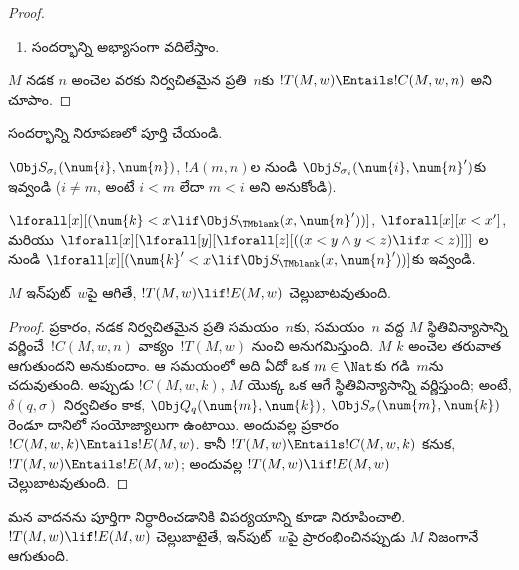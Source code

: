 \documentclass[../../../include/open-logic-section]{subfiles}
\begin{document}
\begin{proof}
\begin{enumerate}
\item {} సందర్భాన్ని అభ్యాసంగా వదిలేస్తాం.
\end{enumerate}
$M$ నడక $n$ అంచెల వరకు నిర్వచితమైన ప్రతి~$n$కు
$!T(M,w) \Entails !C(M,w,n)$ అని చూపాం.
\end{proof}

\begin{prob}
 సందర్భాన్ని
 నిరూపణలో పూర్తి చేయండి.
\end{prob}

\begin{prob}
$\Obj S_{\sigma_i}(\num{i},\num{n})$, $!A(m,n)$ల నుండి
$\Obj S_{\sigma_i}(\num{i},\num{n}')$కు  ఇవ్వండి
($i\neq m$, అంటే $i<m$ లేదా $m<i$ అని అనుకోండి).
\end{prob}

\begin{prob}
$\lforall[x][(\num{k}<x \lif \Obj S_\TMblank(x,\num{n}'))]$,
$\lforall[x][x<x']$, మరియు
$\lforall[x][\lforall[y][\lforall[z][((x<y \land y<z) \lif x<z)]]]$
ల నుండి
$\lforall[x][(\num{k}'<x \lif \Obj S_\TMblank(x,\num{n}'))]$కు
 ఇవ్వండి.
\end{prob}

\begin{lem}
$M$ ఇన్‌పుట్~$w$పై ఆగితే, $!T(M,w) \lif !E(M,w)$ చెల్లుబాటవుతుంది.
\end{lem}

\begin{proof}
 ప్రకారం, నడక నిర్వచితమైన ప్రతి సమయం~$n$కు, సమయం~$n$ వద్ద
$M$ స్థితివిన్యాసాన్ని వర్ణించే~$!C(M,w,n)$ వాక్యం~$!T(M,w)$ నుంచి అనుగమిస్తుంది.
$M$ $k$ అంచెల తరువాత ఆగుతుందని అనుకుందాం. ఆ సమయంలో అది ఏదో ఒక
$m\in\Nat$కు గడి~$m$ను చదువుతుంది. అప్పుడు $!C(M,w,k)$, $M$ యొక్క ఒక
ఆగే స్థితివిన్యాసాన్ని వర్ణిస్తుంది; అంటే, $\delta(q,\sigma)$ నిర్వచితం
కాక, $\Obj Q_q(\num{m},\num{k})$,
$\Obj S_\sigma(\num{m},\num{k})$ రెండూ దానిలో సంయోజ్యాలుగా ఉంటాయి.
అందువల్ల  ప్రకారం
$!C(M,w,k) \Entails !E(M,w)$. కానీ
$!T(M,w) \Entails !C(M,w,k)$ కనుక, $!T(M,w) \Entails !E(M,w)$; అందువల్ల
$!T(M,w) \lif !E(M,w)$ చెల్లుబాటవుతుంది.
\end{proof}

\begin{explain}
మన వాదనను పూర్తిగా నిర్ధారించడానికి విపర్యయాన్ని కూడా నిరూపించాలి.
$!T(M,w) \lif !E(M,w)$ చెల్లుబాటైతే, ఇన్‌పుట్~$w$పై ప్రారంభించినప్పుడు
$M$ నిజంగానే ఆగుతుంది.
\end{explain}
\end{document}
